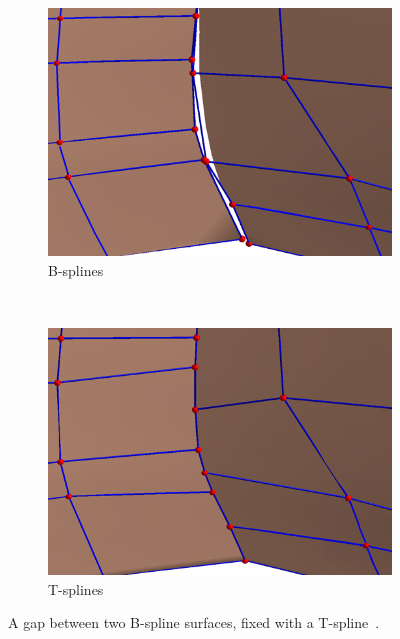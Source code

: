 \begin{figure}[h]
    \centering
    \begin{subfigure}[b]{0.45\textwidth}
        \centering
        \includegraphics[width=\linewidth]{bspline-two-patch}
        \caption{B-splines}
    \end{subfigure}
    ~
    \begin{subfigure}[b]{0.45\textwidth}
        \centering
        \includegraphics[width=\linewidth]{tspline-two-patch}
        \caption{T-splines}
    \end{subfigure}   
    \caption{A gap between two B-spline surfaces, fixed with a T-spline~\cite{sederberg_t-splines_2003}.}\label{fig:Tspline-two-patch}
\end{figure}


